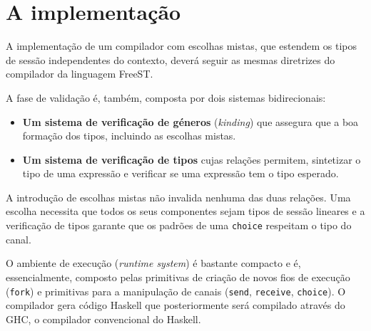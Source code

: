 \section{A implementação}

A implementação de um compilador com escolhas mistas, que estendem os tipos de sessão
independentes do contexto, deverá seguir as mesmas diretrizes do compilador da linguagem FreeST\cite{2019freest,2019freest-inforum}.

A fase de validação é, também, composta por dois sistemas bidirecionais:
\begin{itemize}
\item \textbf{Um sistema de verificação de géneros} (\textit{kinding}) que assegura que a boa formação dos tipos, incluindo as escolhas mistas.
\item \textbf{Um sistema de verificação de tipos} cujas relações permitem, sintetizar o tipo de uma expressão e verificar se uma expressão tem o tipo esperado. 
\end{itemize}
A introdução de escolhas mistas não invalida nenhuma das duas relações.
Uma escolha necessita que todos os seus componentes sejam tipos de sessão lineares e a verificação de tipos garante que os padrões de uma \lstinline|choice| respeitam o tipo do canal.

O ambiente de execução (\textit{runtime system}) é bastante compacto e é, essencialmente, composto pelas primitivas de criação de novos fios de execução (\lstinline|fork|) e primitivas para a manipulação de canais (\lstinline|send|, \lstinline|receive|, \lstinline|choice|). O compilador gera código Haskell que posteriormente será compilado através do GHC, o compilador convencional do Haskell.

